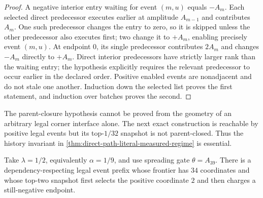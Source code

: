 \begin{proof}
A negative interior entry waiting for event $(m,u)$ equals $-A_m$. Each
selected direct predecessor executes earlier at amplitude $A_{m-1}$ and
contributes $A_m$. One such predecessor changes the entry to zero, so it is
skipped unless the other predecessor also executes first; two change it to
$+A_m$, enabling precisely event $(m,u)$. At endpoint $0$, its single
predecessor contributes $2A_m$ and changes $-A_m$ directly to $+A_m$. Direct
interior predecessors have strictly larger rank than the waiting entry; the
hypothesis explicitly requires the relevant predecessor to occur earlier in
the declared order. Positive enabled events are nonadjacent and do not stale
one another. Induction down the selected list proves the first statement, and
induction over batches proves the second.
\end{proof}

The parent-closure hypothesis cannot be proved from the geometry of an
arbitrary legal corner interface alone.  The next exact construction is
reachable by positive legal events but its top-$1/32$ snapshot is not
parent-closed.  Thus the history invariant in
\cref{thm:direct-path-literal-measured-regime} is essential.

\begin{proposition}
\label{prop:direct-path-static-parent-closure-fails}
Take $\lambda=1/2$, equivalently $\alpha=1/9$, and use spreading gate
$\theta=A_{39}$.  There is a dependency-respecting legal event prefix whose
frontier has $34$ coordinates and whose top-two snapshot first selects the
positive coordinate $2$ and then charges a still-negative endpoint.
\end{proposition}

